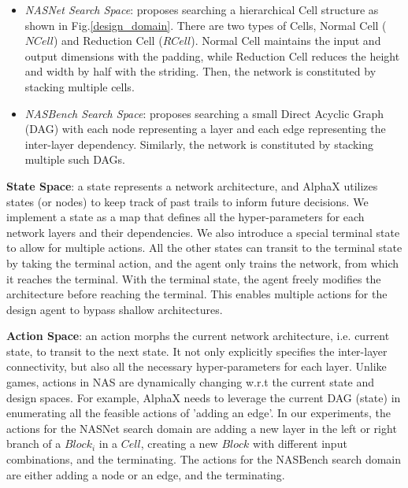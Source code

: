 \documentclass[10pt,twocolumn,letterpaper]{article}
\begin{document}
\begin{itemize}
\item \textit{NASNet Search Space}: \cite{zoph2017learning} proposes searching a hierarchical Cell structure as shown in Fig.\ref{design_domain}. There are two types of Cells, Normal Cell ($NCell$) and Reduction Cell ($RCell$). Normal Cell maintains the input and output dimensions with the padding, while Reduction Cell reduces the height and width by half with the striding. Then, the network is constituted by stacking multiple cells. 

\item \textit{NASBench Search Space}: \cite{ying2019bench} proposes searching a small Direct Acyclic Graph (DAG) with each node representing a layer and each edge representing the inter-layer dependency. Similarly, the network is constituted by stacking multiple such DAGs. 
\end{itemize}

\label{sec:state}

\textbf{State Space}: a state represents a network architecture, and AlphaX utilizes states (or nodes) to keep track of past trails to inform future decisions. We implement a state as a map that defines all the hyper-parameters for each network layers and their dependencies. We also introduce a special terminal state to allow for multiple actions. All the other states can transit to the terminal state by taking the terminal action, and the agent only trains the network, from which it reaches the terminal. With the terminal state, the agent freely modifies the architecture before reaching the terminal. This enables multiple actions for the design agent to bypass shallow architectures.





\textbf{Action Space}: an action morphs the current network architecture, i.e. current state, to transit to the next state. It not only explicitly specifies the inter-layer connectivity, but also all the necessary hyper-parameters for each layer. Unlike games, actions in NAS are dynamically changing w.r.t the current state and design spaces. For example, AlphaX needs to leverage the current DAG (state) in enumerating all the feasible actions of 'adding an edge'. In our experiments, the actions for the NASNet search domain are adding a new layer in the left or right branch of a $Block_i$ in a $Cell$, creating a new $Block$ with different input combinations, and the terminating. The actions for the NASBench search domain are either adding a node or an edge, and the terminating.
\end{document}
